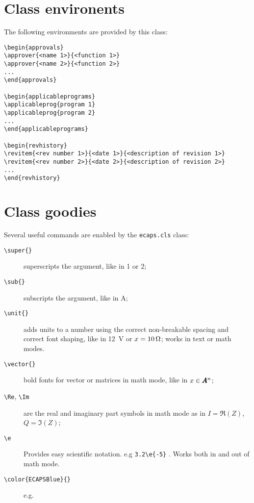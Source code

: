 \documentclass[centerpage]{ecaps}
\begin{document}
\section{Class environents}

The following environments are provided by this class:

\begin{verbatim}
\begin{approvals}
\approver{<name 1>}{<function 1>}
\approver{<name 2>}{<function 2>}
...
\end{approvals}

\begin{applicableprograms}
\applicableprog{program 1}
\applicableprog{program 2}
...
\end{applicableprograms}

\begin{revhistory}
\revitem{<rev number 1>}{<date 1>}{<description of revision 1>}
\revitem{<rev number 2>}{<date 2>}{<description of revision 2>}
... 
\end{revhistory}
\end{verbatim}

\section{Class goodies}

Several useful commands are enabled by the \texttt{ecaps.cls} class:
\begin{description}
\item [\texttt{\textbackslash super\{\}}] superscripts the argument, like in 1 or 2;
\item [\texttt{\textbackslash sub\{\}}] subscripts the argument, like in A;
\item [\texttt{\textbackslash unit\{\}}] adds units to a number using the correct non-breakable spacing and correct font shaping, like in 12\unit{\textmu V} or $x=10\, \mbox{$\Omega$}$; works in text or math modes.
\item [\texttt{\textbackslash vector\{\}}] bold fonts for vector or matrices in math mode, like in $x \in \pmb{A}^n$;
\item [\texttt{\textbackslash Re}, \texttt{\textbackslash Im}] are the real and imaginary part symbols in math mode as in $ I = \Re(Z)$, $Q = \Im(Z)$;
\item [\texttt{\textbackslash e}] Provides easy scientific notation. e.g \verb|3.2\e{-5}| . Works both in and out of math mode.
\item [\texttt{\textbackslash color\{ECAPSBlue\}\{\}}] e.g. \color{ECAPSBlue}{ECAPS Blue!} \color{ECAPSBlue!50}{(A lighter touch.)}
\end{description}
\end{document}
